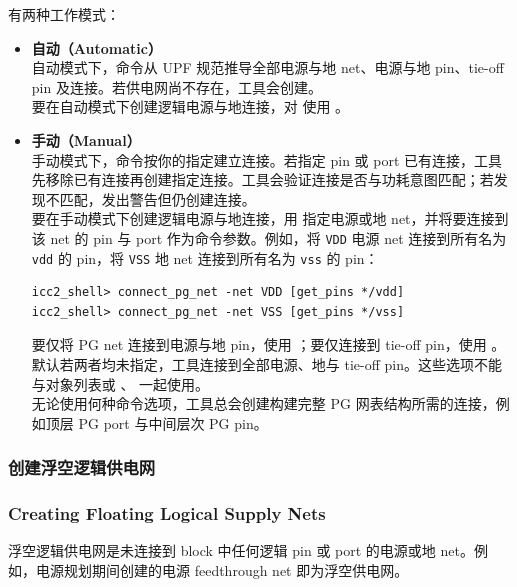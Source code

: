  有两种工作模式：
\begin{itemize}
  \item \textbf{自动（Automatic）}\\
    自动模式下，命令从 UPF 规范推导全部电源与地 net、电源与地 pin、tie-off pin 及连接。若供电网尚不存在，工具会创建。\\
    要在自动模式下创建逻辑电源与地连接，对  使用 。

  \item \textbf{手动（Manual）}\\
    手动模式下，命令按你的指定建立连接。若指定 pin 或 port 已有连接，工具先移除已有连接再创建指定连接。工具会验证连接是否与功耗意图匹配；若发现不匹配，发出警告但仍创建连接。\\
    要在手动模式下创建逻辑电源与地连接，用  指定电源或地 net，并将要连接到该 net 的 pin 与 port 作为命令参数。例如，将 \texttt{VDD} 电源 net 连接到所有名为 \texttt{vdd} 的 pin，将 \texttt{VSS} 地 net 连接到所有名为 \texttt{vss} 的 pin：
\begin{lstlisting}
icc2_shell> connect_pg_net -net VDD [get_pins */vdd]
icc2_shell> connect_pg_net -net VSS [get_pins */vss]
\end{lstlisting}
    要仅将 PG net 连接到电源与地 pin，使用 ；要仅连接到 tie-off pin，使用 。默认若两者均未指定，工具连接到全部电源、地与 tie-off pin。这些选项不能与对象列表或 、 一起使用。\\
    无论使用何种命令选项，工具总会创建构建完整 PG 网表结构所需的连接，例如顶层 PG port 与中间层次 PG pin。
\end{itemize}

\subsubsection{创建浮空逻辑供电网}
\subsubsection*{Creating Floating Logical Supply Nets}

浮空逻辑供电网是未连接到 block 中任何逻辑 pin 或 port 的电源或地 net。例如，电源规划期间创建的电源 feedthrough net 即为浮空供电网。

